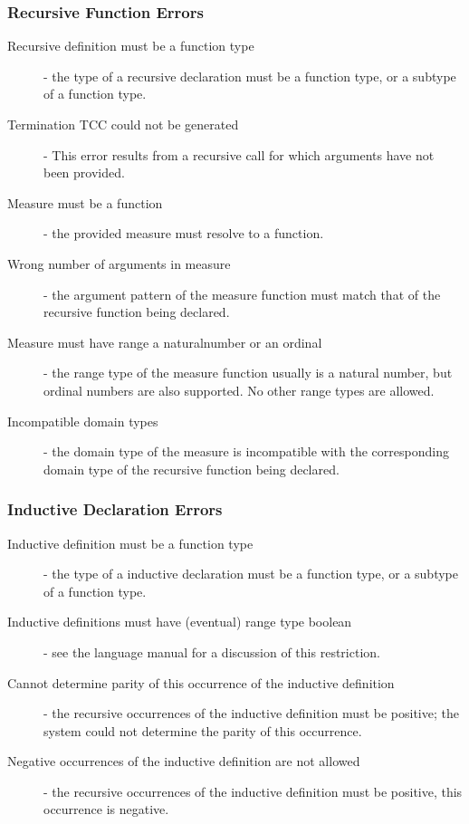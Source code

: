\subsubsection{Recursive Function Errors}

\begin{description}

\item[Recursive definition must be a function type] - the type of a
recursive declaration must be a function type, or a subtype of a function
type.

\item[Termination TCC could not be generated] - This error results from a
recursive call for which arguments have not been provided.

\item[Measure must be a function] - the provided measure must resolve to a
function.

\item[Wrong number of arguments in measure] - the argument pattern of the
measure function must match that of the recursive function being declared.

\item[Measure must have range a naturalnumber or an ordinal] - the range
type of the measure function usually is a natural number, but ordinal
numbers are also supported.  No other range types are allowed.

\item[Incompatible domain types] - the domain type of the measure is
incompatible with the corresponding domain type of the recursive function
being declared.

\end{description}


\subsubsection{Inductive Declaration Errors}

\begin{description}

\item[Inductive definition must be a function type] - the type of a
inductive declaration must be a function type, or a subtype of a function
type.

\item[Inductive definitions must have (eventual) range type boolean] - see
the language manual for a discussion of this restriction.

\item[Cannot determine parity of this occurrence of the inductive
definition] - the recursive occurrences of the inductive definition must
be positive; the system could not determine the parity of this occurrence.

\item[Negative occurrences of the inductive definition are not allowed] -
the recursive occurrences of the inductive definition must be positive,
this occurrence is negative.

\end{description}



